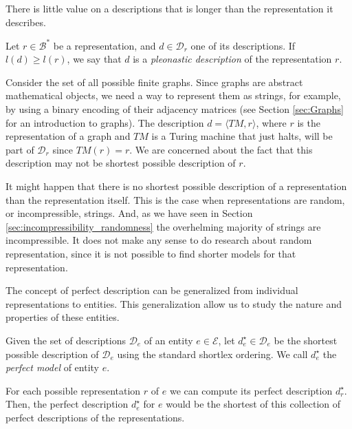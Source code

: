 There is little value on a descriptions that is longer than the representation it describes.

\begin{definition}
\label{def:trivial_model}
Let $r \in \mathcal{B}^\ast$ be a representation, and $d \in \mathcal{D}_r$ one of its descriptions. If $l(d) \geq l(r)$, we say that $d$ is a \emph{pleonastic description} of the representation $r$.
\end{definition}

\begin{example}
\label{ex:topics_models_graph}
Consider the set of all possible finite graphs. Since graphs are abstract mathematical objects, we need a way to represent them as strings, for example, by using a binary encoding of their adjacency matrices (see Section \ref{sec:Graphs} for an introduction to graphs). The description $d = \langle TM, r \rangle$, where $r$ is the representation of a graph and $TM$ is a Turing machine that just halts, will be part of $\mathcal{D}_r$ since $TM(r) = r$. We are concerned about the fact that this description may not be shortest possible description of $r$.
\end{example}

It might happen that there is no shortest possible description of a representation than the representation itself. This is the case when representations are random, or incompressible, strings. And, as we have seen in Section \ref{sec:incompressibility_randomness} the overhelming majority of strings are incompressible. It does not make any sense to do research about random representation, since it is not possible to find shorter models for that representation.

The concept of perfect description can be generalized from individual representations to entities. This generalization allow us to study the nature and properties of these entities.

\begin{definition}
\label{def:entities_perfect_model}
Given the set of descriptions $\mathcal{D}_e$ of an entity $e \in \mathcal{E}$, let $d_e^{\star} \in \mathcal{D}_e$ be the shortest possible description of $\mathcal{D}_e$ using the standard shortlex ordering. We call $d_e^{\star}$ the \emph{perfect model} of entity $e$.
\end{definition}

For each possible representation $r$ of $e$ we can compute its perfect description $d_r^{\star}$. Then, the perfect description $d_e^{\star}$ for $e$ would be the shortest of this collection of perfect descriptions of the representations.

